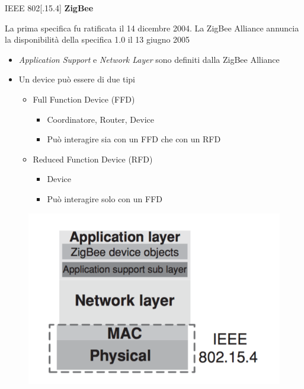 \begin{frame}{IEEE 802[.15.4]}
\textbf{ZigBee}
\begin{block}{}
La prima specifica fu ratificata il 14 dicembre 2004. La ZigBee Alliance annuncia la disponibilità della specifica 1.0 il 13 giugno 2005%
\end{block}
\begin{itemize}
	\item \textit{Application Support} e \textit{Network Layer} sono definiti dalla ZigBee Alliance
	\item Un device può essere di due tipi
	\begin{itemize}
		\item Full Function Device (FFD)
			\begin{itemize}
				\item Coordinatore, Router, Device
				\item Può interagire sia con un FFD che con un RFD
			\end{itemize}
		\item Reduced Function Device (RFD)
			\begin{itemize}
				\item Device
				\item Può interagire solo con un FFD
			\end{itemize}
	\end{itemize}
\end{itemize}
	\begin{figure}[h] 
		\includegraphics[scale=0.2,cfbox=blue_slides 1pt 0pt]{imgs/zbprot.png}
	\end{figure}
\end{frame}


